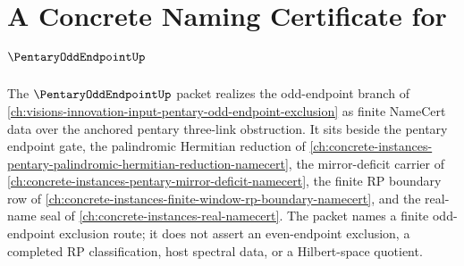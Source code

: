 \chapter{A Concrete Naming Certificate for $\PentaryOddEndpointUp$}
\label{ch:concrete-instances-pentary-odd-endpoint-namecert}

The $\PentaryOddEndpointUp$ packet realizes the odd-endpoint branch of \autoref{ch:visions-innovation-input-pentary-odd-endpoint-exclusion} as finite NameCert data over the anchored pentary three-link obstruction. It sits beside the pentary endpoint gate, the palindromic Hermitian reduction of \autoref{ch:concrete-instances-pentary-palindromic-hermitian-reduction-namecert}, the mirror-deficit carrier of \autoref{ch:concrete-instances-pentary-mirror-deficit-namecert}, the finite RP boundary row of \autoref{ch:concrete-instances-finite-window-rp-boundary-namecert}, and the real-name seal of \autoref{ch:concrete-instances-real-namecert}. The packet names a finite odd-endpoint exclusion route; it does not assert an even-endpoint exclusion, a completed RP classification, host spectral data, or a Hilbert-space quotient.

